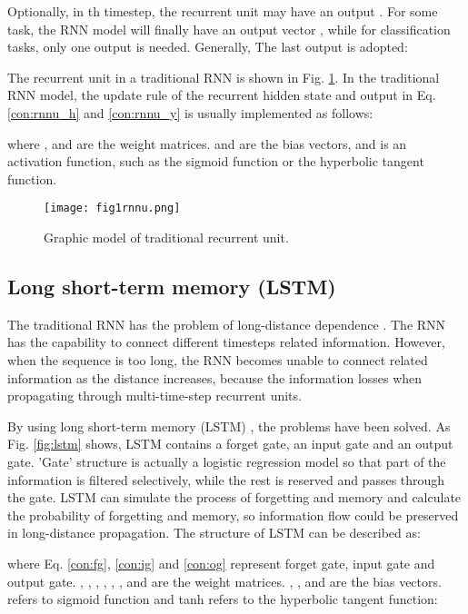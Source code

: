 \documentclass[conference]{IEEEtran}
\begin{document}
Optionally, in th timestep, the recurrent unit may have an output
. For some task, the RNN model will finally have an output vector
{}, while for classification tasks, only one output is needed.
Generally, The last output is adopted:


The recurrent unit in a traditional RNN is shown in Fig. \ref{fig:rnnu}. In the
traditional RNN model, the update rule of the recurrent hidden state and output in
Eq. \eqref{con:rnnu_h} and \eqref{con:rnnu_y} is usually implemented as follows:


where ,  and  are the weight matrices.
 and  are the bias vectors, and  is an activation
function, such as the sigmoid function or the hyperbolic tangent function.

\begin{figure}[htbp]
    \centerline{\texttt{[image: fig1rnnu.png]}}
    \caption{Graphic model of traditional recurrent unit.}
    \label{fig:rnnu}
\end{figure}

\subsection{Long short-term memory (LSTM)}

The traditional RNN has the problem of long-distance dependence
\cite{bengio1994learning}. The RNN has the capability to connect different timesteps
related information. However, when the sequence is too long, the RNN becomes unable to
connect related information as the distance increases, because the information losses
when propagating through multi-time-step recurrent units.

By using long short-term memory (LSTM) \cite{hochreiter1997long}, the problems have
been solved. As Fig. \ref{fig:lstm} shows, LSTM contains a forget gate, an input gate
and an output gate. 'Gate' structure is actually a logistic regression model so that
part of the information is filtered selectively, while the rest is reserved and passes
through the gate. LSTM can simulate the process of forgetting and memory and calculate
the probability of forgetting and memory, so information flow could be preserved in
long-distance propagation. The structure of LSTM can be described as:






where Eq. \eqref{con:fg}, \eqref{con:ig} and \eqref{con:og} represent forget gate,
input gate and output gate.
, , , , ,
,  and  are the weight matrices.
, ,  and  are the bias vectors.
 refers to sigmoid function and tanh refers to the hyperbolic tangent function:
\end{document}
